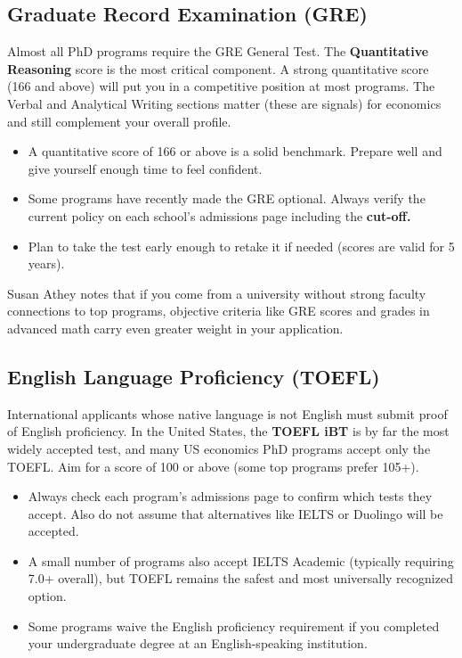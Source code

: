 \documentclass[11pt, letterpaper]{article}
\begin{document}
\subsection{Graduate Record Examination (GRE)}

Almost all PhD programs require the GRE General Test. The \textbf{Quantitative Reasoning} score is the most critical component. A strong quantitative score (166 and above) will put you in a competitive position at most programs. The Verbal and Analytical Writing sections matter (these are signals) for economics and still complement your overall profile.

\begin{itemize}[leftmargin=*, itemsep=2pt]
    \item A quantitative score of 166 or above is a solid benchmark. Prepare well and give yourself enough time to feel confident.
    \item Some programs have recently made the GRE optional. Always verify the current policy on each school's admissions page including the \textbf{cut-off.}
    \item Plan to take the test early enough to retake it if needed (scores are valid for 5 years).
\end{itemize}

\begin{tipbox}
Susan Athey notes that if you come from a university without strong faculty connections to top programs, objective criteria like GRE scores and grades in advanced math carry even greater weight in your application.
\end{tipbox}


\subsection{English Language Proficiency (TOEFL)}

International applicants whose native language is not English must submit proof of English proficiency. In the United States, the \textbf{TOEFL iBT} is by far the most widely accepted test, and many US economics PhD programs accept only the TOEFL. Aim for a score of 100 or above (some top programs prefer 105+).

\begin{itemize}[leftmargin=*, itemsep=2pt]
    \item Always check each program's admissions page to confirm which tests they accept. Also do not assume that alternatives like IELTS or Duolingo will be accepted.
    \item A small number of programs also accept IELTS Academic (typically requiring 7.0+ overall), but TOEFL remains the safest and most universally recognized option.
    \item Some programs waive the English proficiency requirement if you completed your undergraduate degree at an English-speaking institution.
\end{itemize}
\end{document}
